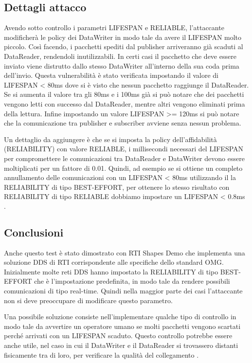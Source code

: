 

\subsection{Dettagli attacco}
Avendo sotto controllo i parametri LIFESPAN e RELIABLE, l'attaccante modificherà le
policy dei DataWriter in modo tale da avere il LIFESPAN molto piccolo. Così
facendo, i pacchetti spediti dal publisher arriveranno già scaduti al DataReader,
rendendoli inutilizzabili. In certi casi il pacchetto che deve essere inviato
viene distrutto dallo stesso DataWriter all'interno della sua coda prima dell'invio. 
Questa vulnerabilità è stato verificata impostando il valore di
LIFESPAN < 80ms dove si è visto che nessun pacchetto raggiunge il DataReader.
Se si aumenta il valore tra gli 80ms e i 100ms già si può notare che dei pacchetti
vengono letti con successo dal DataReader, mentre altri vengono eliminati prima
della lettura. Infine impostando un valore LIFESPAN >= 120ms si può notare che
la comunicazione tra publisher e subscriber avviene senza nessun problema.

Un dettaglio da aggiungere è che se si imposta la policy
dell'affidabilità (RELIABILITY) con valore RELIABLE, i millisecondi necessari
del LIFESPAN per compromettere le comunicazioni tra DataReader e DataWriter
devono essere moltiplicati per un fattore di 0.01. Quindi, ad esempio se si
ottiene un completo annullamento delle comunicazioni con un LIFESPAN < 80ms
utilizzando il la RELIABILITY di tipo BEST-EFFORT, per ottenere lo stesso
risultato con RELIABILITY di tipo RELIABLE dobbiamo impostare un
LIFESPAN < 0.8ms
\cite{DBLP:conf/malware/MichaudDL18}.

\subsection{Conclusioni}
Anche questo test è stato dimostrato con RTI Shapes Demo che 
implementa una
soluzione DDS di RTI corrispondente alle specifiche dello standard OMG.
Inizialmente molte reti DDS hanno impostato la RELIABILITY
di tipo BEST-EFFORT che è l'impostazione predefinita,
in modo tale da rendere possibili comunicazioni di tipo real-time.
Quindi nella maggior parte
dei casi l'attaccante non si deve preoccupare di modificare questo parametro.

Una possibile soluzione consiste nell'implementare qualche tipo di controllo
in modo tale da avvertire un operatore umano se molti pacchetti vengono
scartati perché arrivati con un LIFESPAN scaduto. Questo controllo potrebbe
essere anche utile, nel caso in cui il DataWriter e il DataReader si trovassero
distanti fisicamente tra di loro, per verificare la qualità del collegamento
\cite{DBLP:conf/malware/MichaudDL18}.



